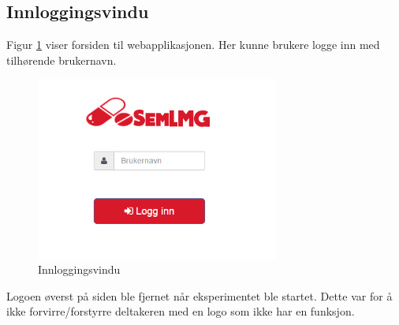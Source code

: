 \subsection{Innloggingsvindu}
Figur \ref{fig:demo1} viser forsiden til webapplikasjonen. Her kunne brukere logge inn med tilhørende brukernavn.
\begin{figure}[H]
\begin{center}
\includegraphics[width=8cm]{images/demoimages/1}
\caption{Innloggingsvindu}
\label{fig:demo1}
\end{center}
\end{figure}
Logoen øverst på siden ble fjernet når eksperimentet ble startet. Dette var for å ikke forvirre/forstyrre deltakeren med en logo som ikke har en funksjon.

